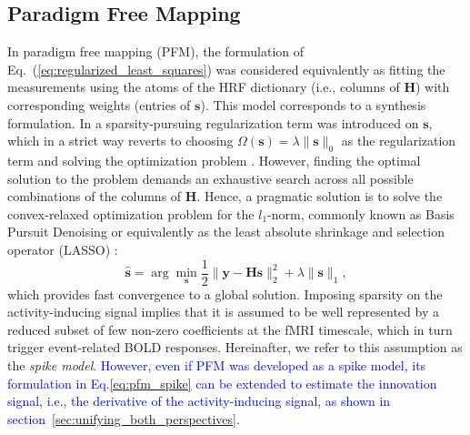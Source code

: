 \subsection{Paradigm Free Mapping}
 In paradigm free mapping (PFM), the formulation of
 Eq.~(\ref{eq:regularized_least_squares}) was considered equivalently as fitting
 the measurements using the atoms of the HRF dictionary (i.e., columns of
 $\mathbf{H}$) with corresponding weights (entries of $\mathbf{s}$). This model
 corresponds to a synthesis formulation. In
 \citealt{Gaudes2013Paradigmfreemapping} a sparsity-pursuing regularization term
 was introduced on $\mathbf{s}$, which in a strict way reverts to choosing
 \(\Omega(\mathbf{s})=\lambda \| \mathbf{s} \|_0\) as the regularization term
 and solving the optimization problem
 \citep{Bruckstein2009SparseSolutionsSystems}. However, finding the optimal
 solution to the problem demands an exhaustive search across all possible
 combinations of the columns of \(\mathbf{H}\). Hence, a  pragmatic solution is
 to solve the convex-relaxed optimization problem for the \(l_1\)-norm, commonly
 known as Basis Pursuit Denoising \citep{Chen2001BasisPursuitDenoising} or
 equivalently as the least absolute shrinkage and selection operator (LASSO)
 \citep{Tibshirani1996RegressionShrinkageSelection}: 
\begin{equation}
    \label{eq:pfm_spike}
    \hat{\mathbf{s}} = \arg \min_{\mathbf{s}} \frac{1}{2} \| \mathbf{y} - \mathbf{Hs} \|_2^2 + \lambda \| \mathbf{s} \|_1,
\end{equation}
which provides fast convergence to a global solution. Imposing sparsity on the
activity-inducing signal implies that it is assumed to be well represented by a
reduced subset of few non-zero coefficients at the fMRI timescale, which in turn
trigger event-related BOLD responses. Hereinafter, we refer to this assumption
as the \textit{spike model}. \textcolor{blue}{However, even if PFM was developed
as a spike model, its formulation in Eq.\eqref{eq:pfm_spike} can be extended to
estimate the innovation signal, i.e., the derivative of the activity-inducing
signal, as shown in section~\ref{sec:unifying_both_perspectives}.}


